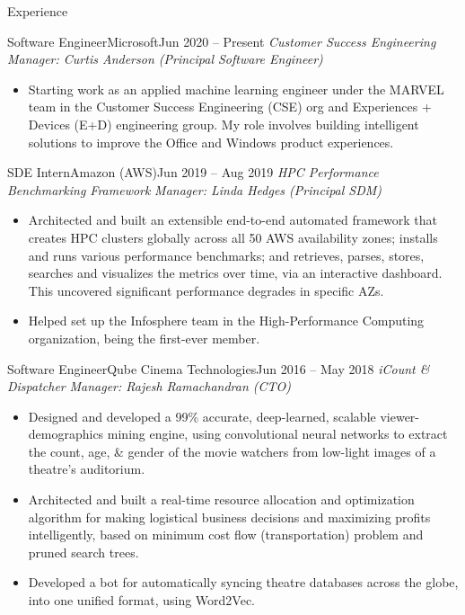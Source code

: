 \documentclass[]{mcdowellcv}
\begin{document}
	\makeheader
	

	\begin{cvsection}{Experience}
	        \begin{cvsubsection}{Software Engineer}{Microsoft}{Jun 2020 – Present}
			\textit{Customer Success Engineering} \hfill \textit{Manager: Curtis Anderson (Principal Software Engineer)}
			\begin{itemize}
            \item Starting work as an applied machine learning engineer under the MARVEL team in the Customer Success Engineering (CSE) org and Experiences + Devices (E+D) engineering group. My role involves building intelligent solutions to improve the Office and Windows product experiences.
			\end{itemize}
		\end{cvsubsection}
	        \begin{cvsubsection}{SDE Intern}{Amazon (AWS)}{Jun 2019 – Aug 2019}
			\textit{HPC Performance Benchmarking Framework} \hfill \textit{Manager: Linda Hedges (Principal SDM)}
			\begin{itemize}
            \item Architected and built an extensible end-to-end automated framework that creates HPC clusters globally across all 50 AWS availability zones; installs and runs various performance benchmarks; and retrieves, parses, stores, searches and visualizes the metrics over time, via an interactive dashboard. This uncovered significant performance degrades in specific AZs. %
            \item Helped set up the Infosphere team in the High-Performance Computing organization, being the first-ever member.
			\end{itemize}
		\end{cvsubsection}

		\begin{cvsubsection}{Software Engineer}{Qube Cinema Technologies}{Jun 2016 – May 2018}
			\textit{iCount \& Dispatcher} \hfill \textit{Manager: Rajesh Ramachandran (CTO)}
			\begin{itemize}
            \item Designed and developed a 99\% accurate, deep-learned, scalable viewer-demographics mining engine, using convolutional neural networks to extract the count, age, \& gender of the movie watchers from low-light images of a theatre's auditorium. %
            \item Architected and built a real-time resource allocation and optimization algorithm for making logistical business decisions and maximizing profits intelligently, based on minimum cost flow (transportation) problem and pruned search trees.
            \item Developed a bot for automatically syncing theatre databases across the globe, into one unified format, using Word2Vec.
			\end{itemize}
		\end{cvsubsection}


\end{cvsection}
\end{document}
